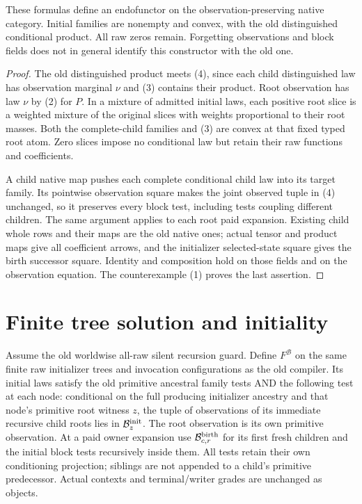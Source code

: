\documentclass[11pt]{article}
\begin{document}
\begin{theorem}
These formulas define an endofunctor on the observation-preserving native category. Initial families are nonempty and convex, with the old distinguished conditional product. All raw zeros remain. Forgetting observations and block fields does not in general identify this constructor with the old one.
\end{theorem}
\begin{proof}
The old distinguished product meets (4), since each child distinguished law has observation marginal $\nu$ and (3) contains their product. Root observation has law $\nu$ by (2) for $P$. In a mixture of admitted initial laws, each positive root slice is a weighted mixture of the original slices with weights proportional to their root masses. Both the complete-child families and (3) are convex at that fixed typed root atom. Zero slices impose no conditional law but retain their raw functions and coefficients.

A child native map pushes each complete conditional child law into its target family. Its pointwise observation square makes the joint observed tuple in (4) unchanged, so it preserves every block test, including tests coupling different children. The same argument applies to each root paid expansion. Existing child whole rows and their maps are the old native ones; actual tensor and product maps give all coefficient arrows, and the initializer selected-state square gives the birth successor square. Identity and composition hold on those fields and on the observation equation. The counterexample (1) proves the last assertion.\end{proof}

\section{Finite tree solution and initiality}
Assume the old worldwise all-raw silent recursion guard. Define $F^{\mathcal B}$ on the same finite raw initializer trees and invocation configurations as the old compiler. Its initial laws satisfy the old primitive ancestral family tests AND the following test at each node: conditional on the full producing initializer ancestry and that node's primitive root witness $z$, the tuple of observations of its immediate recursive child roots lies in $\mathcal B^{\rm init}_z$. The root observation is its own primitive observation. At a paid owner expansion use $\mathcal B^{\rm birth}_{c,r}$ for its first fresh children and the initial block tests recursively inside them. All tests retain their own conditioning projection; siblings are not appended to a child's primitive predecessor. Actual contexts and terminal/writer grades are unchanged as objects.
\end{document}
